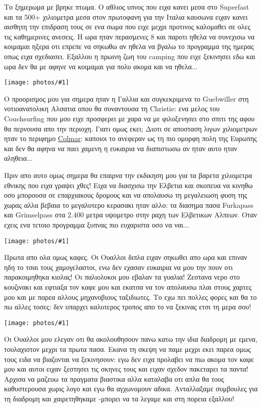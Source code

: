 \documentclass[]{book}
\newcommand\photo[1]{\noindent\texttt{[image: photos/\#1]}}
\begin{document}
Το ξημερωμα με βρηκε πτωμα. Ο αθλιος υπνος που ειχα κανει μεσα στο Superfast και τα 500+ χιλιομετρα μεσα στον πρωτοφανη για την Ιταλια καυσωνα ειχαν κανει αισθητη την επιδραση τους σε ενα σωμα που ειχε μεχρι προτινος καλομαθει σε ολες τις καθημερινες ανεσεις. Η ωρα ηταν περασμενες 8 και παροτι ηθελα να συνεχισω να κοιμαμαι ηξερα οτι επρεπε να σηκωθω αν ηθελα να βγαλω το προγραμμα της ημερας οπως ειχα σχεδιασει. Εξαλλου η πρωινη ζωη του camping που ειχε ξεκινησει εδω και ωρα δεν θα με αφηνε να κοιμαμαι για πολυ ακομα και να ηθελα...

\photo{19.jpg}

Ο προορισμος μου για σημερα ηταν η Γαλλια και συγκεκριμενα το Guebwiller στη νοτιοανατολικη Αλσατια οπου θα συναντουσα τη Christie: ενα μελος του Couchsurfing που μου ειχε προσφερει με χαρα να με φιλοξενησει στο σπιτι της αφου θα περνουσα απο την περιοχη. Γιατι ομως εκει; Διοτι σε αποσταση λιγων χιλιομετρων ηταν το περιφημο \href{http://en.wikipedia.org/wiki/Colmar}{Colmar}: καποιοι το ανεφεραν ως τη πιο ομορφη πολη της Ευρωπης και δεν θα αφηνα να παει χαμενη η ευκαιρια να διαπιστωσω αν ηταν αυτο ηταν αληθεια...

Πριν απο αυτο ομως σημερα θα επαιρνα την εκδικηση μου για τα βαρετα χιλιομετρα εθνικης που ειχα γραψει χθες! Ειχα να διασχισω την Ελβετια και σκοπευα να κινηθω οσο μπορουσα σε επαρχιακους δρομους και να απολαυσω τη μεγαλειωση φυση της χωρας αλλα βεβαια το μεγαλυτερο κερασακι ηταν αλλο: τα διασημα πασα Furkapass και Grimselpass στα 2.400 μετρα υψομετρο στην ραχη των Ελβετικων Αλπεων.
Οταν εχεις ενα τετοιο προγραμμα ξυπνας πιο ευχαριστα οσο να ναι...

\photo{20.jpg}

Πρωτα απο ολα ομως καφες. Οι Ουαλλοι διπλα ειχαν σηκωθει απο ωρα και επιναν ηδη το τσαι τους χαμογελαστοι, ενω δεν εχασαν ευκαιρια να μου την πουν οτι παρακοιμηθηκα κιολας! Οι παλιολυκοι μου εβαλαν τα γυαλια!
Ζεστανα νερο στο κουζινακι και εφτιαξα τον καφε μου και εκατσα να τον απολαυσω πλαι στους χαρτες μου και με παρεα αλλους μηχανοβιους ταξιδιωτες.
Το εχω πει πολλες φορες και θα το πω αλλες τοσες: δεν υπαρχει καλυτερος τροπος απο το να ξεκινας ετσι τη μερα σου!

\photo{21.jpg}

Οι Ουαλλοι μου ελεγαν οτι θα ακολουθησουν πανω κατω την ιδια διαδρομη με εμενα, τουλαχιστον μεχρι τα πρωτα πασα. Εκανα τη σκεψη να παμε μεχρι εκει παρεα ομως τους ειδα να βιαζονται να ξεκινησουν: εγω δεν ειχα προλαβει να πιω ακομα τον καφε μου και αυτοι ειχαν ξεστησει τις σκηνες τους και ειχαν σχεδον πακεταρει τα παντα! 
Αρχισα να μαζευω τα πραγματα βιαστικα αλλα καταλαβα οτι απλα θα τους καθυστερουσα χωρις λογο και εγω θα αγχωνομουν αδικα. Ανταλλαξαμε συμβουλες για τη διαδρομη και χαιρετηθηκαμε -μπορει να τα λεγαμε και στη πορεια εξαλλου!
\end{document}
